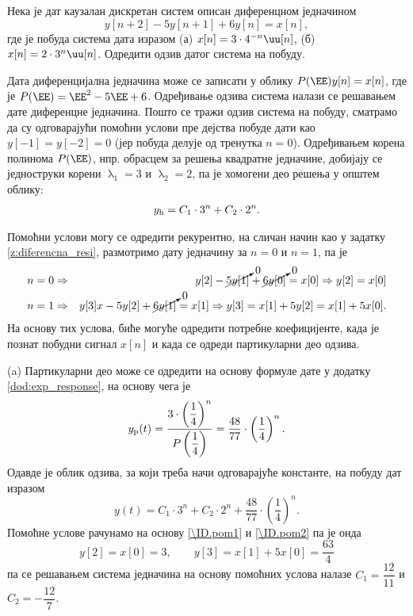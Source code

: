 \PID
Нека је дат каузалан дискретан систем описан диференцном једначином 
$$y[n+2] - 5 y[n+1] + 6 y[n] = x[n],$$ где је побуда система 
дата изразом (а) $x[n] = 3\cdot 4^{-n} \uu[n]$, (б) $x[n] = 2 \cdot 3^n \uu[n]$. Одредити одзив датог система на побуду.     

\RESENJE 
Дата диференцијална једначина може се записати у облику 
$P(\EE) y[n] = x[n]$, где је $P(\EE) = \EE^2 - 5\EE + 6$. 
Одређивање одзива система налази се решавањем дате диференцне једначина. Пошто се тражи одзив система на побуду, 
сматрамо да су одговарајући помоћни услови пре дејства побуде дати као $y[-1] = y[-2] = 0$ (јер побуда делује од 
тренутка $n=0$). Одређивањем корена полинома $P(\EE)$, нпр. обрасцем за решења квадратне једначине, добијају се 
једноструки корени $\uplambda_1 = 3$ и $\uplambda_2 = 2$, па је хомогени део решења у општем облику:
\begin{eqnarray}
    y_{\rm h} = C_1 \cdot 3^n + C_2 \cdot 2^n.
\end{eqnarray}

Помоћни услови могу се одредити рекурентно, на сличан начин као у задатку \ref{z:diferencna_resi}, размотримо дату једначину за $n = 0$ и $n = 1$, па је 
\begin{eqnarray}
    n=0 &\Rightarrow& y[2] - \cancelto{0}{5 y[1]} + \cancelto{0}{6 y[0]} = x[0] \Rightarrow y[2] = x[0] \label{\ID.pom1}
    \\ 
    n=1 &\Rightarrow& y[3] x- 5y[2] + \cancelto{0}{6y[1]} = x[1] \Rightarrow y[3] = x[1] + 5 y[2] = x[1] + 5 x[0]. \label{\ID.pom2}
\end{eqnarray}
На основу тих услова, биће могуће одредити потребне коефицијенте, када је познат побудни сигнал $x[n]$ и када се одреди партикуларни део одзива.



(a) Партикуларни део може се одредити на основу формуле дате у додатку \ref{dod:exp_response}, на основу чега је 
\begin{eqnarray}
    y_{\rm p}(t) = \dfrac{3 \cdot \left( \dfrac14 \right)^n }{ P\left( \dfrac14 \right) } = \dfrac{48}{77} \cdot \left( \dfrac14 \right)^n.
\end{eqnarray}
Одавде је облик одзива, за који треба начи одговарајуће константе, на побуду дат изразом 
\begin{equation}
    y(t) = C_1 \cdot 3^n + C_2 \cdot 2^n +  \dfrac{48}{77} \cdot \left( \dfrac14 \right)^n.
\end{equation}
Помоћне услове рачунамо на основу \eqref{\ID.pom1} и \eqref{\ID.pom2} па је онда 
\begin{equation}
    y[2] = x[0] = 3, \qquad y[3] = x[1] + 5x[0] = \dfrac{63}{4}   
\end{equation}
па се решавањем система једначина на основу помоћних услова налазе $C_1 = \dfrac{12}{11}$ и $C_2 = -\dfrac{12}{7}$.

